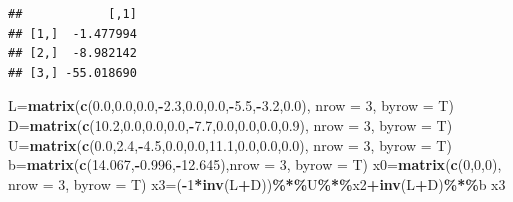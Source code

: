\documentclass[
]{article}
\newenvironment{Shaded}{\begin{snugshade}}{\end{snugshade}}
\newcommand{\AttributeTok}[1]{\textcolor[rgb]{0.13,0.29,0.53}{#1}}
\newcommand{\DecValTok}[1]{\textcolor[rgb]{0.00,0.00,0.81}{#1}}
\newcommand{\FloatTok}[1]{\textcolor[rgb]{0.00,0.00,0.81}{#1}}
\newcommand{\FunctionTok}[1]{\textcolor[rgb]{0.13,0.29,0.53}{\textbf{#1}}}
\newcommand{\NormalTok}[1]{#1}
\newcommand{\OtherTok}[1]{\textcolor[rgb]{0.56,0.35,0.01}{#1}}
\newcommand{\SpecialCharTok}[1]{\textcolor[rgb]{0.81,0.36,0.00}{\textbf{#1}}}
\begin{document}
\begin{verbatim}
##            [,1]
## [1,]  -1.477994
## [2,]  -8.982142
## [3,] -55.018690
\end{verbatim}

\begin{Shaded}
\begin{Highlighting}[]
\NormalTok{  L}\OtherTok{=}\FunctionTok{matrix}\NormalTok{(}\FunctionTok{c}\NormalTok{(}\FloatTok{0.0}\NormalTok{,}\FloatTok{0.0}\NormalTok{,}\FloatTok{0.0}\NormalTok{,}\SpecialCharTok{{-}}\FloatTok{2.3}\NormalTok{,}\FloatTok{0.0}\NormalTok{,}\FloatTok{0.0}\NormalTok{,}\SpecialCharTok{{-}}\FloatTok{5.5}\NormalTok{,}\SpecialCharTok{{-}}\FloatTok{3.2}\NormalTok{,}\FloatTok{0.0}\NormalTok{), }\AttributeTok{nrow =} \DecValTok{3}\NormalTok{, }\AttributeTok{byrow =}\NormalTok{ T)}
\NormalTok{  D}\OtherTok{=}\FunctionTok{matrix}\NormalTok{(}\FunctionTok{c}\NormalTok{(}\FloatTok{10.2}\NormalTok{,}\FloatTok{0.0}\NormalTok{,}\FloatTok{0.0}\NormalTok{,}\FloatTok{0.0}\NormalTok{,}\SpecialCharTok{{-}}\FloatTok{7.7}\NormalTok{,}\FloatTok{0.0}\NormalTok{,}\FloatTok{0.0}\NormalTok{,}\FloatTok{0.0}\NormalTok{,}\FloatTok{0.9}\NormalTok{), }\AttributeTok{nrow =} \DecValTok{3}\NormalTok{, }\AttributeTok{byrow =}\NormalTok{ T)}
\NormalTok{  U}\OtherTok{=}\FunctionTok{matrix}\NormalTok{(}\FunctionTok{c}\NormalTok{(}\FloatTok{0.0}\NormalTok{,}\FloatTok{2.4}\NormalTok{,}\SpecialCharTok{{-}}\FloatTok{4.5}\NormalTok{,}\FloatTok{0.0}\NormalTok{,}\FloatTok{0.0}\NormalTok{,}\FloatTok{11.1}\NormalTok{,}\FloatTok{0.0}\NormalTok{,}\FloatTok{0.0}\NormalTok{,}\FloatTok{0.0}\NormalTok{), }\AttributeTok{nrow =} \DecValTok{3}\NormalTok{, }\AttributeTok{byrow =}\NormalTok{ T)}
\NormalTok{  b}\OtherTok{=}\FunctionTok{matrix}\NormalTok{(}\FunctionTok{c}\NormalTok{(}\FloatTok{14.067}\NormalTok{,}\SpecialCharTok{{-}}\FloatTok{0.996}\NormalTok{,}\SpecialCharTok{{-}}\FloatTok{12.645}\NormalTok{),}\AttributeTok{nrow =} \DecValTok{3}\NormalTok{, }\AttributeTok{byrow =}\NormalTok{ T)}
\NormalTok{  x0}\OtherTok{=}\FunctionTok{matrix}\NormalTok{(}\FunctionTok{c}\NormalTok{(}\DecValTok{0}\NormalTok{,}\DecValTok{0}\NormalTok{,}\DecValTok{0}\NormalTok{), }\AttributeTok{nrow =} \DecValTok{3}\NormalTok{, }\AttributeTok{byrow =}\NormalTok{ T)}
\NormalTok{ x3}\OtherTok{=}\NormalTok{(}\SpecialCharTok{{-}}\DecValTok{1}\SpecialCharTok{*}\FunctionTok{inv}\NormalTok{(L}\SpecialCharTok{+}\NormalTok{D))}\SpecialCharTok{\%*\%}\NormalTok{U}\SpecialCharTok{\%*\%}\NormalTok{x2}\SpecialCharTok{+}\FunctionTok{inv}\NormalTok{(L}\SpecialCharTok{+}\NormalTok{D)}\SpecialCharTok{\%*\%}\NormalTok{b}
\NormalTok{x3}
\end{Highlighting}
\end{Shaded}
\end{document}
